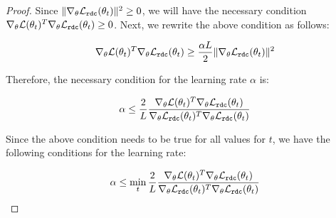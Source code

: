 \begin{proof}
Since $\|\nabla_{\theta} \mathcal L_{\mathtt{rdc}}(\theta_t)\|^2\geq 0$, we will have the necessary condition $\nabla_{\theta} \mathcal{L}(\theta_{t})^T\nabla_{\theta} \mathcal L_{\mathtt{rdc}}(\theta_t) \geq 0$.
Next, we rewrite the above condition as follows:

\begin{align}
    \nabla_{\theta} \mathcal{L}(\theta_{t})^T\nabla_{\theta} \mathcal L_{\mathtt{rdc}}(\theta_t) \geq \frac{\alpha L}{2}\|\nabla_{\theta} \mathcal L_{\mathtt{rdc}}(\theta_t)\|^2
\end{align}

Therefore, the necessary condition for the learning rate $\alpha$ is:

\begin{align}
    \alpha \leq \frac{2}{L}\frac{\nabla_{\theta} \mathcal{L}(\theta_t)^T\nabla_{\theta} \mathcal L_{\mathtt{rdc}}(\theta_t)}{\nabla_{\theta} \mathcal L_{\mathtt{rdc}}(\theta_t)^T\nabla_{\theta} \mathcal L_{\mathtt{rdc}}(\theta_t)}
\end{align}

Since the above condition needs to be true for all values for $t$, we have the following conditions for the learning rate:

\begin{align}
    \alpha \leq \min_{t} \frac{2}{L}\frac{\nabla_{\theta} \mathcal{L}(\theta_t)^T\nabla_{\theta} \mathcal L_{\mathtt{rdc}}(\theta_t)}{\nabla_{\theta} \mathcal L_{\mathtt{rdc}}(\theta_t)^T\nabla_{\theta} \mathcal L_{\mathtt{rdc}}(\theta_t)}
\end{align}

\end{proof}